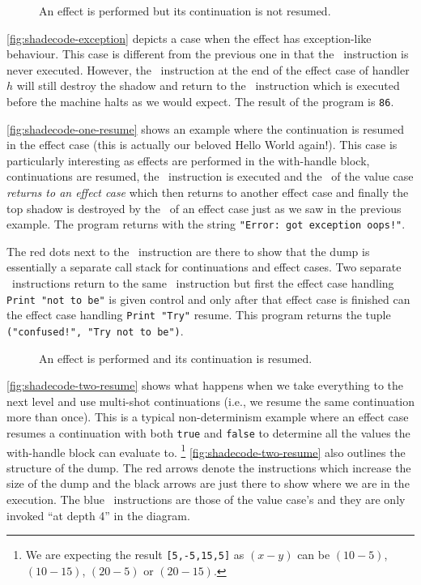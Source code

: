 \documentclass[class=article, crop=false]{standalone}
\begin{document}
\begin{figure}
    \centering
    \caption{An effect is performed but its continuation is not resumed.}
    \label{fig:shadecode-exception}
\end{figure}

\autoref{fig:shadecode-exception} depicts a case when the effect has
exception-like behaviour. This case is different from the previous one in that
the \vmKillShadow\ instruction is never executed. However, the \vmRett\
instruction at the end of the effect case of handler $h$ will still destroy the
shadow and return to the \vmFin\ instruction which is executed before the
machine halts as we would expect. The result of the program is \lstinline|86|.

\autoref{fig:shadecode-one-resume} shows an example where the continuation is
resumed in the effect case (this is actually our beloved Hello World again!).
This case is particularly interesting as effects are performed in the
with-handle block, continuations are resumed, the \vmKillShadow\ instruction is
executed and the \vmRett\ of the value case \emph{returns to an effect case}
which then returns to another effect case and finally the top shadow is
destroyed by the \vmRett\ of an effect case just as we saw in the previous
example. The program returns with the string
\lstinline|"Error: got exception oops!"|.

The red dots next to the \vmApply\ instruction are there to show that the dump
is essentially a separate call stack for continuations and effect cases.
Two separate \vmRett\ instructions return to the same \vmApply\ instruction
but first the effect case handling \lstinline{Print "not to be"} is given
control and only after that effect case is finished can the effect case handling
\lstinline{Print "Try"} resume. This program returns the tuple
\lstinline|("confused!", "Try not to be")|.

\begin{figure}
    \centering
    \caption{An effect is performed and its continuation is resumed.}
    \label{fig:shadecode-one-resume}
\end{figure}
 
\autoref{fig:shadecode-two-resume} shows what happens when we take everything to
the next level and use multi-shot continuations (i.e., we resume the same
continuation more than once). This is a typical non-determinism example where
an effect case resumes a continuation with both \lstinline{true} and
\lstinline{false} to determine all the values the with-handle block can evaluate
to. \footnote{We are expecting the result \lstinline{[5,-5,15,5]} as $(x-y)$
can be $(10-5)$, $(10-15)$, $(20-5)$ or $(20-15)$.}
\autoref{fig:shadecode-two-resume} also outlines the structure of the dump.
The red arrows denote the instructions which increase the size of the dump and
the black arrows are just there to show where we are in the execution.
The blue \vmRett\ instructions are those of the value case's and they are only
invoked ``at depth 4'' in the diagram.
\end{document}
